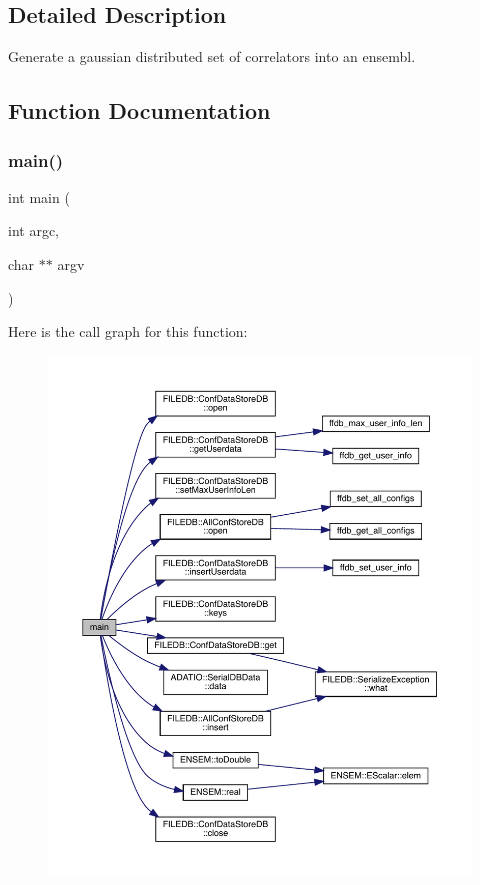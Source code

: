\subsection{Detailed Description}
Generate a gaussian distributed set of correlators into an ensembl. 



\subsection{Function Documentation}
\mbox{\label{adat-devel_2main_2dbutil_2dbgaus__corr_8cc_a3c04138a5bfe5d72780bb7e82a18e627}} 
\subsubsection{\texorpdfstring{main()}{main()}}
{\footnotesize\ttfamily int main (\begin{DoxyParamCaption}\item[{int}]{argc,  }\item[{char $\ast$$\ast$}]{argv }\end{DoxyParamCaption})}

Here is the call graph for this function\+:
\nopagebreak
\begin{figure}[H]
\begin{center}
\leavevmode
\includegraphics[width=350pt]{d9/d5d/adat-devel_2main_2dbutil_2dbgaus__corr_8cc_a3c04138a5bfe5d72780bb7e82a18e627_cgraph}
\end{center}
\end{figure}
